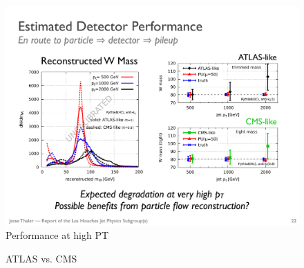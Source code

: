 \documentclass[11pt,letterpaper]{article}
\begin{document}
\begin{figure}
\begin{center}
\includegraphics[width=0.75\columnwidth]{figures/pt_degrade}
\end{center}
\caption{Performance at high PT}
\label{fig:nolabel}
\end{figure}



\begin{figure}
\begin{center}
\qquad
{}
\end{center}
\caption{ATLAS vs. CMS
}
\label{fig:phasespace}
\end{figure}
\end{document}
